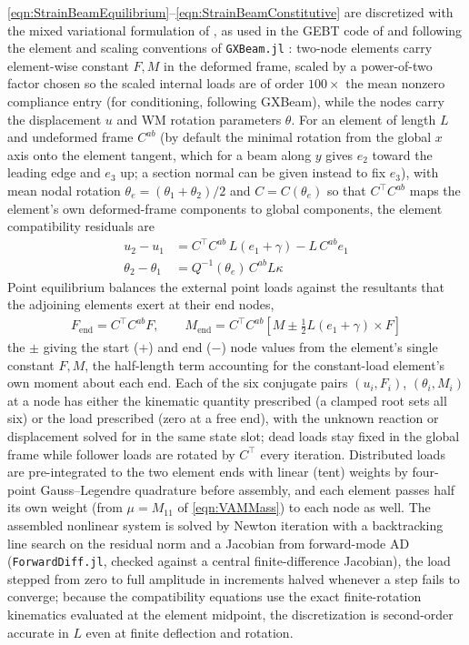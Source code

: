 \documentclass[10pt]{article}
\newcommand{\half}{\frac{1}{2}}
\newcommand{\beq}{\begin{equation}\begin{aligned}}
\newcommand{\eeq}{\end{aligned}\end{equation}}
\newcommand{\tn}[1]{\textrm{#1}}
\begin{document}
\autoref{eqn:StrainBeamEquilibrium}--\autoref{eqn:StrainBeamConstitutive} are discretized with the mixed variational formulation of \citet{Hodges1990}, as used in the GEBT code of \citet{Yu2012GEBT} and following the element and scaling conventions of \texttt{GXBeam.jl} \citep{McDonnell2022}: two-node elements carry element-wise constant $F, M$ in the deformed frame, scaled by a power-of-two factor chosen so the scaled internal loads are of order $100\times$ the mean nonzero compliance entry (for conditioning, following GXBeam), while the nodes carry the displacement $u$ and \ac{WM} rotation parameters $\theta$.
For an element of length $L$ and undeformed frame $C^{ab}$ (by default the minimal rotation from the global $x$ axis onto the element tangent, which for a beam along $y$ gives $e_2$ toward the leading edge and $e_3$ up; a section normal can be given instead to fix $e_3$), with mean nodal rotation $\theta_e=(\theta_1+\theta_2)/2$ and $C=C(\theta_e)$ so that $C^\top C^{ab}$ maps the element's own deformed-frame components to global components, the element compatibility residuals are
\beq
u_2-u_1 &= C^\top C^{ab}\,L(e_1+\gamma) - L\,C^{ab}e_1 \\
\theta_2-\theta_1 &= Q^{-1}(\theta_e)\,C^{ab}L\kappa
\label{eqn:StrainBeamCompatibility}
\eeq
Point equilibrium balances the external point loads against the resultants that the adjoining elements exert at their end nodes,
\beq
F_{\tn{end}} = C^\top C^{ab} F, \qquad
M_{\tn{end}} = C^\top C^{ab}\left[M \pm \half L(e_1+\gamma)\times F\right]
\label{eqn:StrainBeamEndLoads}
\eeq
the $\pm$ giving the start ($+$) and end ($-$) node values from the element's single constant $F, M$, the half-length term accounting for the constant-load element's own moment about each end.
Each of the six conjugate pairs $(u_i,F_i)$, $(\theta_i,M_i)$ at a node has either the kinematic quantity prescribed (a clamped root sets all six) or the load prescribed (zero at a free end), with the unknown reaction or displacement solved for in the same state slot; dead loads stay fixed in the global frame while follower loads are rotated by $C^\top$ every iteration.
Distributed loads are pre-integrated to the two element ends with linear (tent) weights by four-point Gauss--Legendre quadrature before assembly, and each element passes half its own weight (from $\mu=M_{11}$ of \autoref{eqn:VAMMass}) to each node as well.
The assembled nonlinear system is solved by Newton iteration with a backtracking line search on the residual norm and a Jacobian from forward-mode \ac{AD} (\texttt{ForwardDiff.jl}, checked against a central finite-difference Jacobian), the load stepped from zero to full amplitude in increments halved whenever a step fails to converge; because the compatibility equations use the exact finite-rotation kinematics evaluated at the element midpoint, the discretization is second-order accurate in $L$ even at finite deflection and rotation.
\end{document}
